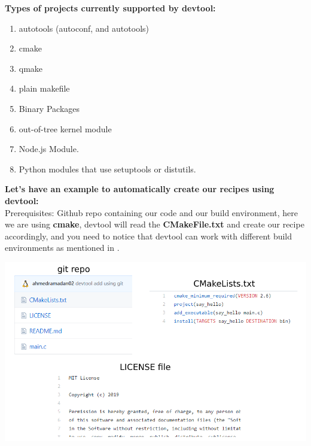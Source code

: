 \documentclass{article}
\begin{document}
\textbf{Types of projects currently supported by devtool:}
\label{devtool-supported-projects}
\begin{enumerate}
  \item autotools (autoconf, and autotools)
  \item cmake
  \item qmake
  \item plain makefile
  \item Binary Packages
  \item out-of-tree kernel module
  \item Node.js Module.
  \item Python modules that use setuptools or distutils.
\end{enumerate}

\textbf{Let's have an example to automatically create our recipes using devtool: }\\
Prerequisites: Github repo containing our code and our build environment, here we are using \textbf{cmake}, devtool will read the \textbf{CMakeFile.txt} and create our recipe accordingly, and you need to notice that devtool can work with different build environments as mentioned in .\\
\begin{center}
  \includegraphics[scale=0.4]{./resources/img/devtool-git-repo.png}
\end{center}
\end{document}
